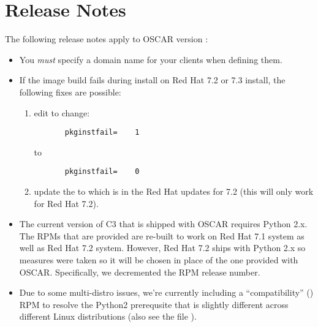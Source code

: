 %
%
%

\section{Release Notes}

The following release notes apply to OSCAR version \oscarversion:

\begin{itemize}
\item You {\em must} specify a domain name for your clients when
  defining them.
  
\item If the image build fails during install on Red Hat 7.2 or 7.3
  install, the following fixes are possible:

  \begin{enumerate}
  \item edit  to
  change:

\begin{verbatim}
       pkginstfail=    1
\end{verbatim}

     to
\begin{verbatim}
       pkginstfail=    0
\end{verbatim}
     
   \item update the  to  which is in
     the Red Hat updates for 7.2 (this will only work for Red Hat 7.2).
  \end{enumerate}
  
\item The current version of C3 that is shipped with OSCAR requires
  Python 2.x.  The RPMs that are provided are re-built to work on Red
  Hat 7.1 system as well as Red Hat 7.2 system.  However, Red Hat 7.2
  ships with Python 2.x so measures were taken so it will be chosen in
  place of the one provided with OSCAR.  Specifically, we decremented
  the RPM release number.
  
\item Due to some multi-distro issues, we're currently including a
  ``compatibility'' () RPM to resolve the
  Python2 prerequsite that is slightly different across different
  Linux distributions (also see the file
  ).

\end{itemize}
